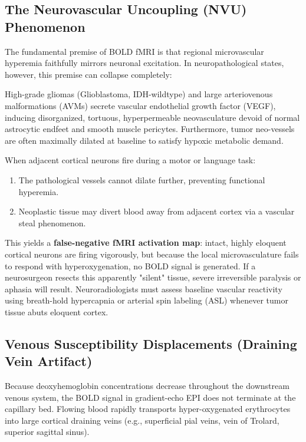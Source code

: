 \documentclass[11pt,a4paper]{article}
\begin{document}
\subsection{The Neurovascular Uncoupling (NVU) Phenomenon}
The fundamental premise of BOLD fMRI is that regional microvascular hyperemia faithfully mirrors neuronal excitation. In neuropathological states, however, this premise can collapse completely:
\begin{physicsbox}
High-grade gliomas (Glioblastoma, IDH-wildtype) and large arteriovenous malformations (AVMs) secrete vascular endothelial growth factor (VEGF), inducing disorganized, tortuous, hyperpermeable neovasculature devoid of normal astrocytic endfeet and smooth muscle pericytes. Furthermore, tumor neo-vessels are often maximally dilated at baseline to satisfy hypoxic metabolic demand.

When adjacent cortical neurons fire during a motor or language task:
\begin{enumerate}
    \item The pathological vessels cannot dilate further, preventing functional hyperemia.
    \item Neoplastic tissue may divert blood away from adjacent cortex via a vascular steal phenomenon.
\end{enumerate}
This yields a \textbf{false-negative fMRI activation map}: intact, highly eloquent cortical neurons are firing vigorously, but because the local microvasculature fails to respond with hyperoxygenation, no BOLD signal is generated. If a neurosurgeon resects this apparently "silent" tissue, severe irreversible paralysis or aphasia will result. Neuroradiologists must assess baseline vascular reactivity using breath-hold hypercapnia or arterial spin labeling (ASL) whenever tumor tissue abuts eloquent cortex.
\end{physicsbox}

\subsection{Venous Susceptibility Displacements (Draining Vein Artifact)}
Because deoxyhemoglobin concentrations decrease throughout the downstream venous system, the BOLD signal in gradient-echo EPI does not terminate at the capillary bed. Flowing blood rapidly transports hyper-oxygenated erythrocytes into large cortical draining veins (e.g., superficial pial veins, vein of Trolard, superior sagittal sinus). 
\end{document}
